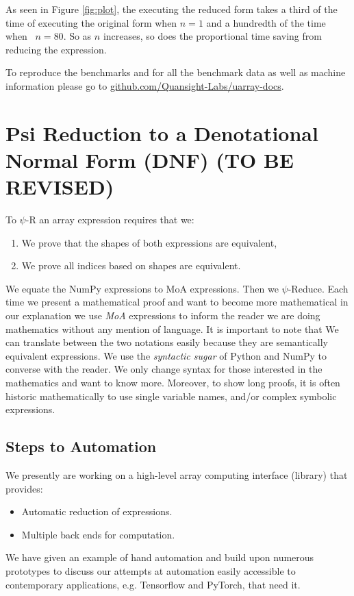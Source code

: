 \documentclass[a4paper,12pt]{article}
\begin{document}
As seen in Figure \ref{fig:plot}, the executing the reduced  form takes a third of the time of executing the original form when $n=1$ and a hundredth of the time when
~$n=80$. So as $n$ increases, so does the proportional time saving from reducing the expression.

To reproduce the benchmarks and for all the benchmark data as well as machine information please go to \href{https://github.com/Quansight-Labs/uarray-docs/tree/fcb6baf8bb7284ac7223de73a70cf47063df9e4b/benchmarks}{github.com/Quansight-Labs/uarray-docs}.


\section{Psi Reduction to a Denotational Normal Form (DNF) (TO BE REVISED)}
To $\psi$-R an array expression requires that we:
\begin{enumerate}
    \item We  prove that the shapes of both expressions are equivalent,
    \item We prove all indices based on shapes are equivalent.
\end{enumerate}


We equate the NumPy expressions to MoA expressions. Then we $\psi$-Reduce.
Each time we present a mathematical proof and want to become more mathematical in our explanation we use  {\em MoA} expressions to inform the reader we are doing mathematics without any mention of language. It is important to note that We can translate between the two notations easily  because they are semantically equivalent expressions. We use the {\em syntactic sugar} of Python and NumPy to  converse with the reader. We only change syntax for those interested in the mathematics and want to know more. Moreover, to show long proofs, it is often historic mathematically to use single variable names, and/or complex symbolic expressions.
\subsection{Steps to Automation}
We presently are working on a high-level array computing interface (library) that provides:
\begin{itemize}
    \item Automatic reduction of expressions.
    \item Multiple back ends for computation. 
\end{itemize}
We have given an example of hand automation and build upon numerous prototypes to discuss our attempts
at automation easily accessible to contemporary applications, e.g. Tensorflow and PyTorch, that need it. 
\end{document}
